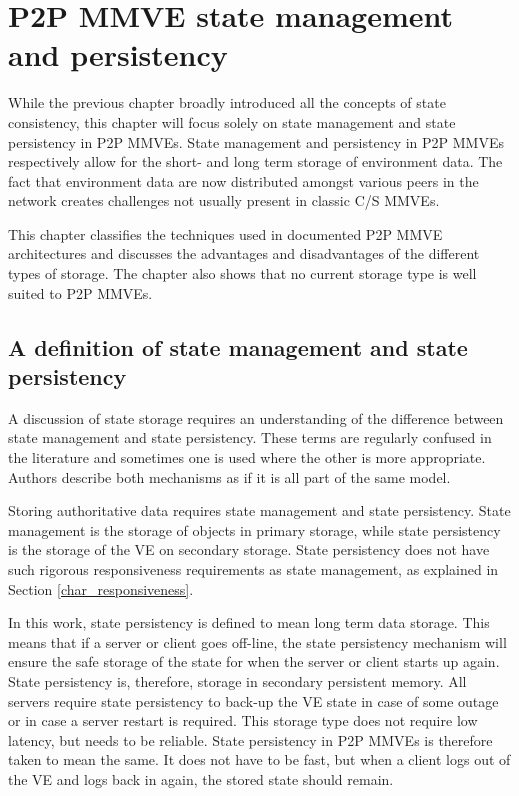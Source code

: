 \chapter{P2P MMVE state management and persistency}
\label{p2p_MMVE_state_persistency}

While the previous chapter broadly introduced all the concepts of state consistency, this chapter will focus solely on state management and state persistency in P2P MMVEs. State management and persistency in P2P MMVEs respectively allow for the short- and long term storage of environment data. The fact that environment data are now distributed amongst various peers in the network creates challenges not usually present in classic C/S MMVEs.

This chapter classifies the techniques used in documented P2P MMVE architectures and discusses the advantages and disadvantages of the different types of storage. The chapter also shows that no current storage type is well suited to P2P MMVEs.

\section{A definition of state management and state persistency}
\label{management_persistency_def}

A discussion of state storage requires an understanding of the difference between state management and state persistency. These terms are regularly confused in the literature and sometimes one is used where the other is more appropriate. Authors describe both mechanisms as if it is all part of the same model.

Storing authoritative data requires state management and state persistency. State management is the storage of objects in primary storage, while state persistency is the storage of the VE on secondary storage. State persistency does not have such rigorous responsiveness requirements as state management, as explained in Section \ref{char_responsiveness}.

In this work, state persistency is defined to mean long term data storage. This means that if a server or client goes off-line, the state persistency mechanism will ensure the safe storage of the state for when the server or client starts up again. State persistency is, therefore, storage in secondary persistent memory. All servers require state persistency to back-up the VE state in case of some outage or in case a server restart is required. This storage type does not require low latency, but needs to be reliable. State persistency in P2P MMVEs is therefore taken to mean the same. It does not have to be fast, but when a client logs out of the VE and logs back in again, the stored state should remain.

